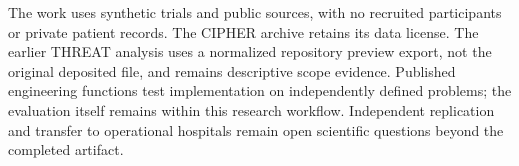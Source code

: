 The work uses synthetic trials and public sources, with no recruited
participants or private patient records. The CIPHER archive retains its data
license. The earlier THREAT analysis uses a normalized repository preview
export, not the original deposited file, and remains descriptive scope evidence.
Published engineering functions test implementation on independently defined
problems; the evaluation itself remains within this research workflow.
Independent replication and transfer to operational hospitals remain open
scientific questions beyond the completed artifact.

